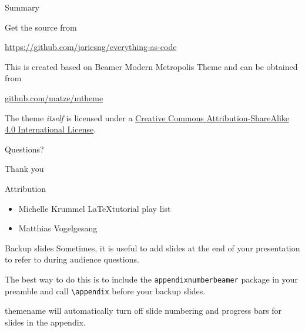 \documentclass{beamer}
\begin{document}
\begin{frame}{Summary}

  Get the source from 

  \begin{center}
    \url{https://github.com/jaricsng/everything-as-code}
  \end{center}

  This is created based on Beamer Modern Metropolis Theme and can be obtained from 

  \begin{center}\url{github.com/matze/mtheme}\end{center}

  The theme \emph{itself} is licensed under a
  \href{http://creativecommons.org/licenses/by-sa/4.0/}{Creative Commons
  Attribution-ShareAlike 4.0 International License}.

  \begin{center}\ccbysa\end{center}

\end{frame}

{
\begin{frame}[standout]
  Questions?
\end{frame}
}

{
\begin{frame}[standout]
  Thank you
\end{frame}
}

\begin{frame}{Attribution}
  \begin{itemize}
    \item Michelle Krummel \LaTeX tutorial play list 
    \href{https://www.youtube.com/watch?v=0fsWGg81RwU&list=PL1D4EAB31D3EBC449&index=15}{}
    \item Matthias Vogelgesang \tiny\href{https://github.com/matze/mtheme}{}
  \end{itemize}    
\end{frame}

\begin{frame}[fragile]{Backup slides}
  Sometimes, it is useful to add slides at the end of your presentation to
  refer to during audience questions.

  The best way to do this is to include the \verb|appendixnumberbeamer|
  package in your preamble and call \verb|\appendix| before your backup slides.

  themename will automatically turn off slide numbering and progress bars for
  slides in the appendix.
\end{frame}
\end{document}

